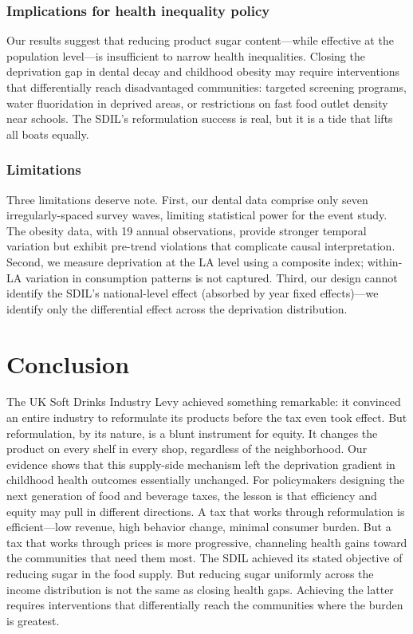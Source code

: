 \documentclass[12pt]{article}
\begin{document}
\subsubsection*{Implications for health inequality policy} Our results suggest that reducing product sugar content---while effective at the population level---is insufficient to narrow health inequalities. Closing the deprivation gap in dental decay and childhood obesity may require interventions that differentially reach disadvantaged communities: targeted screening programs, water fluoridation in deprived areas, or restrictions on fast food outlet density near schools. The SDIL's reformulation success is real, but it is a tide that lifts all boats equally.

\subsubsection*{Limitations} Three limitations deserve note. First, our dental data comprise only seven irregularly-spaced survey waves, limiting statistical power for the event study. The obesity data, with 19 annual observations, provide stronger temporal variation but exhibit pre-trend violations that complicate causal interpretation. Second, we measure deprivation at the LA level using a composite index; within-LA variation in consumption patterns is not captured. Third, our design cannot identify the SDIL's national-level effect (absorbed by year fixed effects)---we identify only the differential effect across the deprivation distribution.

\section{Conclusion}

The UK Soft Drinks Industry Levy achieved something remarkable: it convinced an entire industry to reformulate its products before the tax even took effect. But reformulation, by its nature, is a blunt instrument for equity. It changes the product on every shelf in every shop, regardless of the neighborhood. Our evidence shows that this supply-side mechanism left the deprivation gradient in childhood health outcomes essentially unchanged. For policymakers designing the next generation of food and beverage taxes, the lesson is that efficiency and equity may pull in different directions. A tax that works through reformulation is efficient---low revenue, high behavior change, minimal consumer burden. But a tax that works through prices is more progressive, channeling health gains toward the communities that need them most. The SDIL achieved its stated objective of reducing sugar in the food supply. But reducing sugar uniformly across the income distribution is not the same as closing health gaps. Achieving the latter requires interventions that differentially reach the communities where the burden is greatest.
\end{document}
